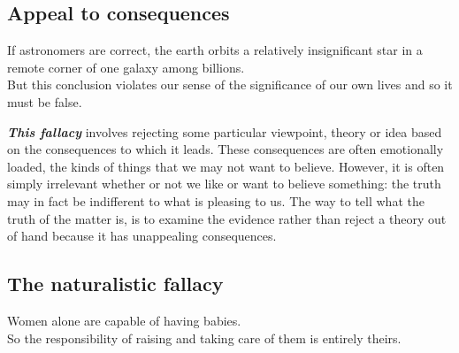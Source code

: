 \documentclass[12pt, openany]{book}
\begin{document}
\hypertarget{appeal-to-consequences}{%
\subsection*{Appeal to consequences}\label{appeal-to-consequences}}


\begin{center}

\begin{argument}

If astronomers are correct, the earth orbits a relatively insignificant star in a remote corner of one galaxy among billions.\\

But this conclusion violates our sense of the significance of our own lives and so it must be false.

\end{argument}

\end{center}

\textbf{\emph{This fallacy}} involves rejecting some particular viewpoint, theory or idea based on the consequences to which it leads. These consequences are often emotionally loaded, the kinds of things that we may not want to believe. However, it is often simply irrelevant whether or not we like or want to believe something: the truth may in fact be indifferent to what is pleasing to us. The way to tell what the truth of the matter is, is to examine the evidence rather than reject a theory out of hand because it has unappealing consequences.

\hypertarget{the-naturalistic-fallacy}{%
\subsection*{The naturalistic fallacy}\label{the-naturalistic-fallacy}}


\begin{center}

\begin{argument}

Women alone are capable of having babies.\\

So the responsibility of raising and taking care of them is entirely theirs.

\end{argument}

\end{center}
\end{document}
